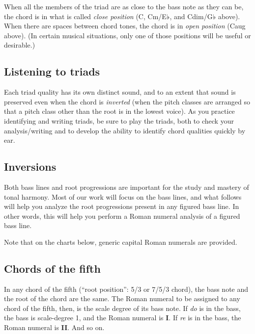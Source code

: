 \documentclass{book}
\begin{document}
When all the members of the triad are as close to the bass note as they can
be, the chord is in what is called \emph{close position} (C, Cm/E♭, and
Cdim/G♭ above). When there are spaces between chord tones, the chord is in
\emph{open position} (Caug above). (In certain musical situations, only one of
those positions will be useful or desirable.)

\hypertarget{listening-to-triads}{%
\subsection{Listening to triads}\label{listening-to-triads}}

Each triad quality has its own distinct sound, and to an extent that sound is
preserved even when the chord is \emph{inverted} (when the pitch classes are
arranged so that a pitch class other than the root is in the lowest voice). As
you practice identifying and writing triads, be sure to play the triads, both
to check your analysis/writing and to develop the ability to identify chord
qualities quickly by ear.

\hypertarget{inversions}{%
\subsection{Inversions}\label{inversions}}

Both bass lines and root progressions are important for the study and mastery
of tonal harmony. Most of our work will focus on the bass lines, and what
follows will help you analyze the root progressions present in any figured
bass line. In other words, this will help you perform a Roman numeral analysis
of a figured bass line.

Note that on the charts below, generic capital Roman numerals are provided.

\hypertarget{chords-of-the-fifth}{%
\subsection{Chords of the fifth}\label{chords-of-the-fifth}}

In any chord of the fifth (``root position'': 5/3 or 7/5/3 chord), the bass
note and the root of the chord are the same. The Roman numeral to be assigned
to any chord of the fifth, then, is the scale degree of its bass note. If
\emph{do} is in the bass, the bass is scale-degree 1, and the Roman numeral is
\textbf{I}. If \emph{re} is in the bass, the Roman numeral is \textbf{II}. And
so on.
\end{document}
